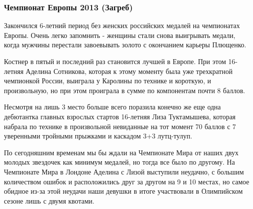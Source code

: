  
 
 
 
 

\subsubsection{Чемпионат Европы 2013 (Загреб)}

Закончился 6-летний период без женских российских медалей на чемпионатах
Европы. Очень легко запомнить - женщины стали снова выигрывать медали, когда
мужчины перестали завоевывать золото с окончанием карьеры Плющенко.


Костнер в пятый и последний раз становится лучшей в Европе. При этом 16-летняя
Аделина Сотникова, которая к этому моменту была уже трехкратной чемпионкой
России, выиграла у Каролины по технике и короткую, и произвольную, но при этом
проиграла в сумме по компонентам почти 8 баллов.


Несмотря на лишь 3 место больше всего поразила конечно же еще одна дебютантка
главных взрослых стартов 16-летняя Лиза Туктамышева, которая набрала по технике
в произвольной невиданные на тот момент 70 баллов с 7 уверенными тройными
прыжками и каскадом 3+3 лутц-тулуп. 

По сегодняшним временам мы бы ждали на Чемпионате Мира от наших двух молодых
звездочек как минимум медалей, но тогда все было по другому. На Чемпионате Мира
в Лондоне Аделина с Лизой выступили неудачно, с большим количеством ошибок и
расположились друг за другом на 9 и 10 местах, но самое обидное из-за этой
неудачи наши девушки в итоге участвовали в Олимпийском сезоне лишь с двумя
квотами. 

